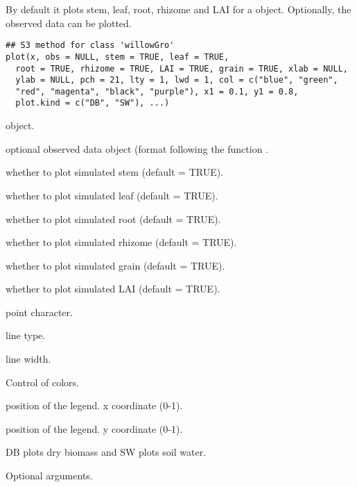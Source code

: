 \documentclass[letterpaper]{book}
\begin{document}
%
\begin{Description}\relax
By default it plots stem, leaf, root, rhizome and LAI for a
 object. Optionally, the observed data can
be plotted.
\end{Description}
%
\begin{Usage}
\begin{verbatim}
## S3 method for class 'willowGro'
plot(x, obs = NULL, stem = TRUE, leaf = TRUE,
  root = TRUE, rhizome = TRUE, LAI = TRUE, grain = TRUE, xlab = NULL,
  ylab = NULL, pch = 21, lty = 1, lwd = 1, col = c("blue", "green",
  "red", "magenta", "black", "purple"), x1 = 0.1, y1 = 0.8,
  plot.kind = c("DB", "SW"), ...)
\end{verbatim}
\end{Usage}
%
\begin{Arguments}
\begin{ldescription}
\item[\code{x}]  object.

\item[\code{obs}] optional observed data object (format
following the  function .

\item[\code{stem}] whether to plot simulated stem (default =
TRUE).

\item[\code{leaf}] whether to plot simulated leaf (default =
TRUE).

\item[\code{root}] whether to plot simulated root (default =
TRUE).

\item[\code{rhizome}] whether to plot simulated rhizome (default
= TRUE).

\item[\code{grain}] whether to plot simulated grain (default =
TRUE).

\item[\code{LAI}] whether to plot simulated LAI (default =
TRUE).

\item[\code{pch}] point character.

\item[\code{lty}] line type.

\item[\code{lwd}] line width.

\item[\code{col}] Control of colors.

\item[\code{x1}] position of the legend. x coordinate (0-1).

\item[\code{y1}] position of the legend. y coordinate (0-1).

\item[\code{plot.kind}] DB plots dry biomass and SW plots soil
water.

\item[\code{...}] Optional arguments.
\end{ldescription}
\end{Arguments}
\end{document}
